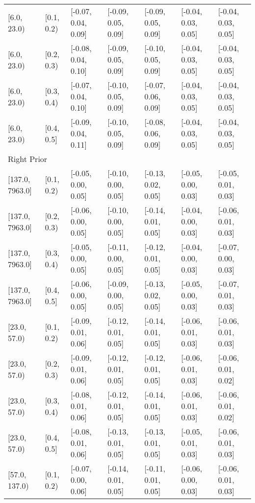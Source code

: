\begin{table}[ht]
\begin{tabular}{lllllll}
  {[6.0, 23.0)} & {[0.1, 0.2)} & {[-0.07, 0.04, 0.09]} & {[-0.09, 0.05, 0.09]} & {[-0.09, 0.05, 0.09]} & {[-0.04, 0.03, 0.05]} & {[-0.04, 0.03, 0.05]} \\ 
  {[6.0, 23.0)} & {[0.2, 0.3)} & {[-0.08, 0.04, 0.10]} & {[-0.09, 0.05, 0.09]} & {[-0.10, 0.05, 0.09]} & {[-0.04, 0.03, 0.05]} & {[-0.04, 0.03, 0.05]} \\ 
  {[6.0, 23.0)} & {[0.3, 0.4)} & {[-0.07, 0.04, 0.10]} & {[-0.10, 0.05, 0.09]} & {[-0.07, 0.06, 0.09]} & {[-0.04, 0.03, 0.05]} & {[-0.04, 0.03, 0.05]} \\ 
  {[6.0, 23.0)} & {[0.4, 0.5]} & {[-0.09, 0.04, 0.11]} & {[-0.10, 0.05, 0.09]} & {[-0.08, 0.06, 0.09]} & {[-0.04, 0.03, 0.05]} & {[-0.04, 0.03, 0.05]} \\ 
   \midrule
\multicolumn{7}{l}{Right Prior}\\
{[137.0, 7963.0]} & {[0.1, 0.2)} & {[-0.05, 0.00, 0.05]} & {[-0.10, 0.00, 0.05]} & {[-0.13, 0.02, 0.05]} & {[-0.05, 0.00, 0.03]} & {[-0.05, 0.01, 0.03]} \\ 
  {[137.0, 7963.0]} & {[0.2, 0.3)} & {[-0.06, 0.00, 0.05]} & {[-0.10, 0.00, 0.05]} & {[-0.14, 0.01, 0.05]} & {[-0.04, 0.00, 0.03]} & {[-0.06, 0.01, 0.03]} \\ 
  {[137.0, 7963.0]} & {[0.3, 0.4)} & {[-0.05, 0.00, 0.05]} & {[-0.11, 0.00, 0.05]} & {[-0.12, 0.01, 0.05]} & {[-0.04, 0.00, 0.03]} & {[-0.07, 0.00, 0.03]} \\ 
  {[137.0, 7963.0]} & {[0.4, 0.5]} & {[-0.06, 0.00, 0.05]} & {[-0.09, 0.00, 0.05]} & {[-0.13, 0.02, 0.05]} & {[-0.05, 0.00, 0.03]} & {[-0.07, 0.01, 0.03]} \\ 
  {[23.0, 57.0)} & {[0.1, 0.2)} & {[-0.09, 0.01, 0.06]} & {[-0.12, 0.01, 0.05]} & {[-0.14, 0.01, 0.05]} & {[-0.06, 0.01, 0.03]} & {[-0.06, 0.01, 0.03]} \\ 
  {[23.0, 57.0)} & {[0.2, 0.3)} & {[-0.09, 0.01, 0.06]} & {[-0.12, 0.01, 0.05]} & {[-0.12, 0.01, 0.05]} & {[-0.06, 0.01, 0.03]} & {[-0.06, 0.01, 0.02]} \\ 
  {[23.0, 57.0)} & {[0.3, 0.4)} & {[-0.08, 0.01, 0.06]} & {[-0.12, 0.01, 0.05]} & {[-0.14, 0.01, 0.05]} & {[-0.06, 0.01, 0.03]} & {[-0.06, 0.01, 0.02]} \\ 
  {[23.0, 57.0)} & {[0.4, 0.5]} & {[-0.08, 0.01, 0.06]} & {[-0.13, 0.01, 0.05]} & {[-0.13, 0.01, 0.05]} & {[-0.05, 0.01, 0.03]} & {[-0.06, 0.01, 0.03]} \\ 
  {[57.0, 137.0)} & {[0.1, 0.2)} & {[-0.07, 0.00, 0.06]} & {[-0.14, 0.01, 0.05]} & {[-0.11, 0.01, 0.05]} & {[-0.06, 0.00, 0.03]} & {[-0.06, 0.01, 0.03]} \\ 

\end{tabular}
\end{table}
